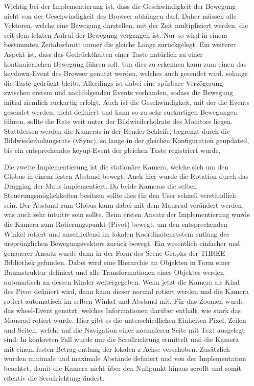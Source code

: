 Wichtig bei der Implementierung ist, dass die Geschwindigkeit der Bewegung nicht von der Geschwindigkeit des Browser abhängen darf. Daher müssen alle Vektoren, welche eine Bewegung darstellen, mit der Zeit multipliziert werden, die seit dem letzten Aufruf der Bewegung vergangen ist. Nur so wird in einem bestimmten Zeitabschnitt immer die gleiche Länge zurückgelegt. Ein weiterer Aspekt ist, dass das Gedrückthalten einer Taste natürlich zu einer kontinuierlichen Bewegung führen soll. Um dies zu erkennen kann zum einen das keydown-Event des Browser genutzt werden, welches auch gesendet wird, solange die Taste gedrückt bleibt. Allerdings ist dabei eine spürbare Verzögerung zwischen erstem und nachfolgenden Events vorhanden, sodass die Bewegung initial ziemlich ruckartig erfolgt. Auch ist die Geschwindigkeit, mit der die Events gesendet werden, nicht definiert und kann so zu sehr ruckartigen Bewegungen führen, sollte die Rate weit unter der Bildwiederholrate des Monitors liegen. Stattdessen werden die Kameras in der Render-Schleife, begrenzt durch die Bildwiederholungsrate (vSync), so lange in der gleichen Konfiguration geupdated, bis ein entsprechendes keyup-Event der gleichen Taste registriert wurde.

Die zweite Implementierung ist die stationäre Kamera, welche sich um den Globus in einem festen Abstand bewegt. Auch hier wurde die Rotation durch das Dragging der Maus implementiert. Da beide Kameras die selben Steuerungsmöglichkeiten besitzen sollte dies für den User schnell verständlich sein. Der Abstand zum Globus kann dabei mit dem Mausrad verändert werden, was auch sehr intuitiv sein sollte. Beim ersten Ansatz der Implementierung wurde die Kamera zum Rotierungspunkt (Pivot) bewegt, um den entsprechenden Winkel rotiert und anschließend im lokalen Koordinatensystem entlang des ursprünglichen Bewegungsvektors zurück bewegt. Ein wesentlich einfacher und genauerer Ansatz wurde dann in der Form des Scene-Graphs der THREE Bibliothek gefunden. Dabei wird eine Hierarchie an Objekten in Form einer Baumstruktur definiert und alle Transformationen eines Objektes werden automatisch an dessen Kinder weitergegeben. Wenn jetzt die Kamera als Kind des Pivot definiert wird, dann kann dieser normal rotiert werden und die Kamera rotiert automatisch im selben Winkel und Abstand mit. Für das Zoomen wurde das wheel-Event genutzt, welches Informationen darüber enthält, wie stark das Mausrad rotiert wurde. Hier gibt es die unterschiedlichen Einheiten Pixel, Zeilen und Seiten, welche auf die Navigation einer normaleren Seite mit Text ausgelegt sind. In konkreten Fall wurde nur die Scrollrichtung ermittelt und die Kamera mit einem festen Betrag entlang der lokalen z-Achse verschoben. Zusätzlich wurden minimale und maximale Abstände definiert und von der Implementation beachtet, damit die Kamera nicht über den Nullpunkt hinaus scrollt und somit effektiv die Scrollrichtung ändert.

